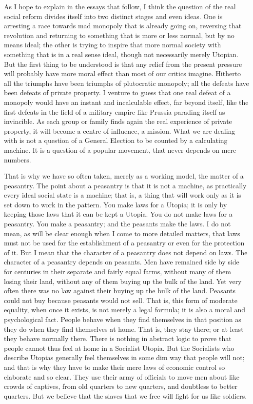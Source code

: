 \documentclass{book}
\begin{document}
As I hope to explain in the essays that follow, I think the question of the real social reform divides itself into two distinct stages and even ideas. One is arresting a race towards mad monopoly that is already going on, reversing that revolution and returning to something that is more or less normal, but by no means ideal; the other is trying to inspire that more normal society with something that is in a real sense ideal, though not necessarily merely Utopian. But the first thing to be understood is that any relief from the present pressure will probably have more moral effect than most of our critics imagine. Hitherto all the triumphs have been triumphs of plutocratic monopoly; all the defeats have been defeats of private property. I venture to guess that one real defeat of a monopoly would have an instant and incalculable effect, far beyond itself, like the first defeats in the field of a military empire like Prussia parading itself as invincible. As each group or family finds again the real experience of private property, it will become a centre of influence, a mission. What we are dealing with is not a question of a General Election to be counted by a calculating machine. It is a question of a popular movement, that never depends on mere numbers.

That is why we have so often taken, merely as a working model, the matter of a peasantry. The point about a peasantry is that it is not a machine, as practically every ideal social state is a machine; that is, a thing that will work only as it is set down to work in the pattern. You make laws for a Utopia; it is only by keeping those laws that it can be kept a Utopia. You do not make laws for a peasantry. You make a peasantry; and the peasants make the laws. I do not mean, as will be clear enough when I come to more detailed matters, that laws must not be used for the establishment of a peasantry or even for the protection of it. But I mean that the character of a peasantry does not depend on laws. The character of a peasantry depends on peasants. Men have remained side by side for centuries in their separate and fairly equal farms, without many of them losing their land, without any of them buying up the bulk of the land. Yet very often there was no law against their buying up the bulk of the land. Peasants could not buy because peasants would not sell. That is, this form of moderate equality, when once it exists, is not merely a legal formula; it is also a moral and psychological fact. People behave when they find themselves in that position as they do when they find themselves at home. That is, they stay there; or at least they behave normally there. There is nothing in abstract logic to prove that people cannot thus feel at home in a Socialist Utopia. But the Socialists who describe Utopias generally feel themselves in some dim way that people will not; and that is why they have to make their mere laws of economic control so elaborate and so clear. They use their army of officials to move men about like crowds of captives, from old quarters to new quarters, and doubtless to better quarters. But we believe that the slaves that we free will fight for us like soldiers.
\end{document}
